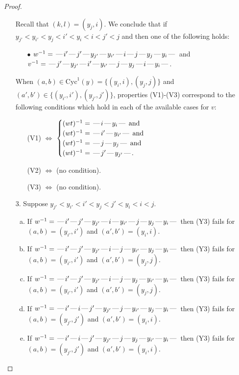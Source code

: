 \documentclass[10pt]{article}
\theoremstyle{definition}
\theoremstyle{definition}
\def\dash{\text{\hspace{0.5mm}---\hspace{0.5mm}}}
\def\Cyc{\mathrm{Cyc}}
\begin{document}
\begin{proof}
\begin{enumerate}
\begin{enumerate}[(a)]
\end{enumerate}
Recall that $(k,l) = (y_j,i)$.
We conclude that if $y_{j'} < y_{i'} < y_j < i' < y_i < i < j' < j$ and then one of the following holds:
\begin{enumerate}
\item[$\bullet$] $w^{-1} = \dash i'\dash j'\dash y_{j'}\dash y_{i'}\dash i\dash j\dash y_j\dash y_i\dash $ and $v^{-1} = \dash j'\dash y_{j'}\dash i'\dash y_{i'}\dash j\dash y_j\dash i\dash y_i\dash $.
\end{enumerate}
When $(a,b)\in\Cyc^1(y)=\{(y_i,i),(y_j,j)\}$ and $(a',b')\in\{(y_{i'},i'),(y_{j'},j')\}$,
properties (V1)-(V3) correspond to the following conditions which hold in
each of the available cases for $v$:
\begin{enumerate}
\item[](V1) $\Leftrightarrow$ $\begin{cases}\text{$(wt)^{-1} = \dash i \dash y_i \dash$}\text{ and }\\
\text{$(wt)^{-1} = \dash i' \dash y_{i'} \dash$}\text{ and }\\
\text{$(wt)^{-1} = \dash j \dash y_j \dash$}\text{ and }\\
\text{$(wt)^{-1} = \dash j' \dash y_{j'} \dash$}.\end{cases}$
\item[](V2) $\Leftrightarrow$ (no condition).
\item[](V3) $\Leftrightarrow$ (no condition).
\end{enumerate}
\item[$3$.] Suppose $y_{j'} < y_{i'} < i' < y_j < j' < y_i < i < j$.
\begin{enumerate}[(a)]
\item If $w^{-1} = \dash i'\dash j'\dash y_{j'}\dash i\dash y_{i'}\dash j\dash y_j\dash y_i\dash $ then (Y3) fails for $(a,b)=(y_{i'},i')$ and $(a',b')=(y_i,i)$.
\item If $w^{-1} = \dash i'\dash j'\dash y_{j'}\dash i\dash j\dash y_{i'}\dash y_j\dash y_i\dash $ then (Y3) fails for $(a,b)=(y_{i'},i')$ and $(a',b')=(y_j,j)$.
\item If $w^{-1} = \dash i'\dash j'\dash y_{j'}\dash i\dash j\dash y_j\dash y_{i'}\dash y_i\dash $ then (Y3) fails for $(a,b)=(y_{i'},i')$ and $(a',b')=(y_j,j)$.
\item If $w^{-1} = \dash i'\dash i\dash j'\dash y_{j'}\dash j\dash y_{i'}\dash y_j\dash y_i\dash $ then (Y3) fails for $(a,b)=(y_{j'},j')$ and $(a',b')=(y_i,i)$.
\item If $w^{-1} = \dash i'\dash i\dash j'\dash y_{j'}\dash j\dash y_j\dash y_{i'}\dash y_i\dash $ then (Y3) fails for $(a,b)=(y_{j'},j')$ and $(a',b')=(y_i,i)$.

\end{enumerate}
\end{enumerate}
\end{proof}
\end{document}
